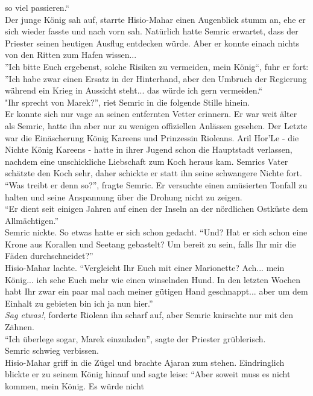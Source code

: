 so viel passieren.``\\
Der junge König sah auf, starrte Hisio-Mahar einen Augenblick stumm an, ehe er sich wieder fasste 
und nach vorn sah. Natürlich hatte Semric erwartet, dass der Priester seinen heutigen Ausflug 
entdecken würde. Aber er konnte einach nichts von den Ritten zum Hafen wissen... \\
''Ich bitte Euch ergebenst, solche Risiken zu vermeiden, mein König``, fuhr er fort: ''Ich habe 
zwar einen Ersatz in der Hinterhand, aber den Umbruch der Regierung während ein Krieg in 
Aussicht steht... das würde ich gern vermeiden.``\\
"Ihr sprecht von Marek?'', riet Semric in die folgende Stille hinein.\\
Er konnte sich nur vage an seinen entfernten Vetter erinnern. Er war weit älter als Semric, hatte 
ihn aber nur zu wenigen offiziellen Anlässen gesehen. Der Letzte war die Einäscherung König Kareens 
und Prinzessin Rioleans. Aril Hor'Le - die Nichte König Kareens - hatte in ihrer Jugend schon die 
Hauptstadt verlassen, nachdem eine unschickliche Liebschaft zum Koch heraus kam. Semrics Vater 
schätzte den Koch sehr, daher schickte er statt ihn seine schwangere Nichte fort.\\
``Was treibt er denn so?'', fragte Semric. Er versuchte einen amüsierten Tonfall zu halten und 
seine Anspannung über die Drohung nicht zu zeigen.\\
``Er dient seit einigen Jahren auf einen der Inseln an der nördlichen Ostküste dem Allmächtigen.''\\
Semric nickte. So etwas hatte er sich schon gedacht. ``Und? Hat er sich schon eine Krone aus 
Korallen und Seetang gebastelt? Um bereit zu sein, falls Ihr mir die Fäden durchschneidet?''\\
Hisio-Mahar lachte. ``Vergleicht Ihr Euch mit einer Marionette? Ach... mein König... ich sehe Euch 
mehr wie einen winselnden Hund. In den letzten Wochen habt Ihr zwar ein paar mal nach meiner 
gütigen Hand geschnappt... aber um dem Einhalt zu gebieten bin ich ja nun hier.''\\
\textit{Sag etwas!}, forderte Riolean ihn scharf auf, aber Semric knirschte nur mit den Zähnen.\\
``Ich überlege sogar, Marek einzuladen'', sagte der Priester grüblerisch.\\
Semric schwieg verbissen.\\
Hisio-Mahar griff in die Zügel und brachte Ajaran zum stehen. Eindringlich blickte er zu seinem 
König hinauf und sagte leise: ``Aber soweit muss es nicht kommen, mein König. Es würde nicht 
